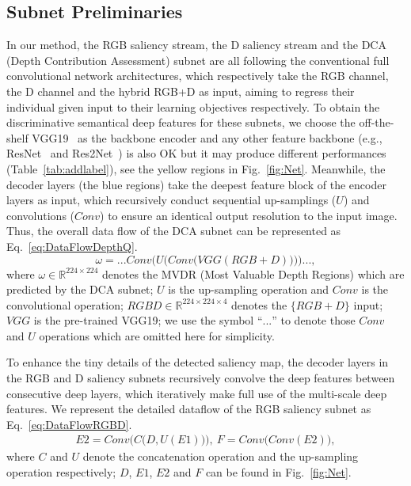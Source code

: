 \documentclass[journal]{IEEEtran}
\begin{document}
\subsection{Subnet Preliminaries}
\label{sec:SNP}
In our method, the RGB saliency stream, the D saliency stream and the DCA (Depth Contribution Assessment) subnet are all following the conventional full convolutional network architectures, which respectively take the RGB channel, the D channel and the hybrid RGB+D as input, aiming to regress their individual given input to their learning objectives respectively.
To obtain the discriminative semantical deep features for these subnets, we choose the off-the-shelf VGG19~\cite{simonyan2014very} as the backbone encoder and any other feature backbone (e.g., ResNet~\cite{he2016deep} and Res2Net~\cite{gao2019res2net}) is also OK but it may produce different performances (Table~\ref{tab:addlabel}), see the yellow regions in Fig.~\ref{fig:Net}.
Meanwhile, the decoder layers (the blue regions) take the deepest feature block of the encoder layers as input, which recursively conduct sequential up-samplings ($U$) and convolutions ($Conv$) to ensure an identical output resolution to the input image.
Thus, the overall data flow of the DCA subnet can be represented as Eq.~\ref{eq:DataFlowDepthQ}.
\begin{equation}
\label{eq:DataFlowDepthQ}
\omega = ...Conv\bigg(U\Big(Conv\big(VGG(RGB+D)\big)\Big)\bigg)...,
\end{equation}
where $\omega\in\mathbb{R}^{224\times 224}$ denotes the MVDR (Most Valuable Depth Regions) which are predicted by the DCA subnet; $U$ is the up-sampling operation and $Conv$ is the convolutional operation; $RGBD\in\mathbb{R}^{224\times 224\times 4}$ denotes the $\{RGB+D\}$ input; $VGG$ is the pre-trained VGG19; we use the symbol ``$...$'' to denote those $Conv$ and $U$ operations which are omitted here for simplicity.

To enhance the tiny details of the detected saliency map, the decoder layers in the RGB and D saliency subnets recursively convolve the deep features between consecutive deep layers, which iteratively make full use of the multi-scale deep features.
We represent the detailed dataflow of the RGB saliency subnet as Eq.~\ref{eq:DataFlowRGBD}.
\begin{equation}
\begin{split}
E2 = Conv\Big(C\big(D,U(E1)\big)\Big),\ F = Conv\big(Conv(E2)\big),
\label{eq:DataFlowRGBD}
\end{split}
\end{equation}
where $C$ and $U$ denote the concatenation operation and the up-sampling operation respectively; $D$, $E1$, $E2$ and $F$ can be found in Fig.~\ref{fig:Net}.
\end{document}
